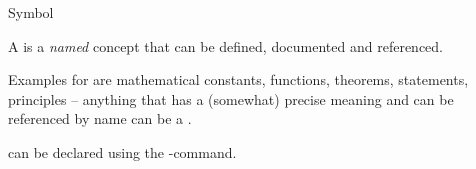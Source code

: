 \documentclass{stex}
\begin{document}
  \begin{smodule}[title=\sTeX-Symbols]{Symbol}

    \begin{sparagraph}[style={defibox,symdoc},name=symbol]
        A  is a \emph{named} 
        concept that can be defined, documented and referenced.

        Examples for  are mathematical constants, 
        functions, theorems, statements, principles -- anything
        that has a (somewhat) precise meaning and can be referenced
        by name can be a .
        
         can be declared using the -command.
    \end{sparagraph}
    
  \end{smodule}
\end{document}

